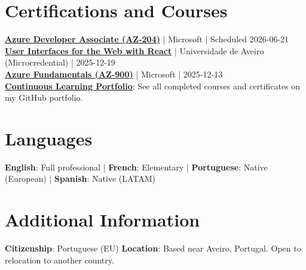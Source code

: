 \documentclass[a4paper,10pt]{article}
\begin{document}
\section{Certifications and Courses}
\vspace{2pt}
{\small
\href{https://learn.microsoft.com/en-us/credentials/certifications/azure-developer}{\textbf{Azure Developer Associate (AZ-204)}} | Microsoft | Scheduled 2026-06-21\\[2pt]
\href{https://github.com/fernandotonacoder/continuous-learning-portfolio/blob/main/certificates/2025/2025-12-19%20Microcredential%20in%20User%20Interfaces%20for%20Web%20with%20React.pdf}{\textbf{User Interfaces for the Web with React}} | Universidade de Aveiro (Microcredential) | 2025-12-19\\[2pt]
\href{https://learn.microsoft.com/en-us/users/fernandotona/credentials/1fa38d8943c25bf2}{\textbf{Azure Fundamentals (AZ-900)}} | Microsoft | 2025-12-13\\[2pt]
\href{https://github.com/fernandotonacoder/continuous-learning-portfolio/tree/main/certificates}{\textbf{Continuous Learning Portfolio}}: See all completed courses and certificates on my GitHub portfolio.
}

\section{Languages}
\vspace{2pt}
{\small
\textbf{English}: Full professional \quad | \quad
\textbf{French}: Elementary \quad | \quad
\textbf{Portuguese}: Native (European) \quad | \quad
\textbf{Spanish}: Native (LATAM)
}

\section{Additional Information}
\vspace{2pt}
{\small
\textbf{Citizenship}: Portuguese (EU) \quad
\textbf{Location}: Based near Aveiro, Portugal. Open to relocation to another country.
}
\end{document}
